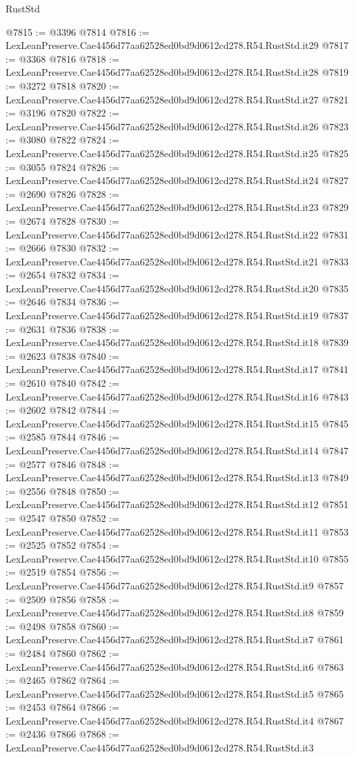 \begin{lexlean}{RustStd}
\begin{coremodule}
@7815 := @3396 @7814
@7816 := LexLeanPreserve.Cae4456d77aa62528ed0bd9d0612cd278.R54.RustStd.it29
@7817 := @3368 @7816
@7818 := LexLeanPreserve.Cae4456d77aa62528ed0bd9d0612cd278.R54.RustStd.it28
@7819 := @3272 @7818
@7820 := LexLeanPreserve.Cae4456d77aa62528ed0bd9d0612cd278.R54.RustStd.it27
@7821 := @3196 @7820
@7822 := LexLeanPreserve.Cae4456d77aa62528ed0bd9d0612cd278.R54.RustStd.it26
@7823 := @3080 @7822
@7824 := LexLeanPreserve.Cae4456d77aa62528ed0bd9d0612cd278.R54.RustStd.it25
@7825 := @3055 @7824
@7826 := LexLeanPreserve.Cae4456d77aa62528ed0bd9d0612cd278.R54.RustStd.it24
@7827 := @2690 @7826
@7828 := LexLeanPreserve.Cae4456d77aa62528ed0bd9d0612cd278.R54.RustStd.it23
@7829 := @2674 @7828
@7830 := LexLeanPreserve.Cae4456d77aa62528ed0bd9d0612cd278.R54.RustStd.it22
@7831 := @2666 @7830
@7832 := LexLeanPreserve.Cae4456d77aa62528ed0bd9d0612cd278.R54.RustStd.it21
@7833 := @2654 @7832
@7834 := LexLeanPreserve.Cae4456d77aa62528ed0bd9d0612cd278.R54.RustStd.it20
@7835 := @2646 @7834
@7836 := LexLeanPreserve.Cae4456d77aa62528ed0bd9d0612cd278.R54.RustStd.it19
@7837 := @2631 @7836
@7838 := LexLeanPreserve.Cae4456d77aa62528ed0bd9d0612cd278.R54.RustStd.it18
@7839 := @2623 @7838
@7840 := LexLeanPreserve.Cae4456d77aa62528ed0bd9d0612cd278.R54.RustStd.it17
@7841 := @2610 @7840
@7842 := LexLeanPreserve.Cae4456d77aa62528ed0bd9d0612cd278.R54.RustStd.it16
@7843 := @2602 @7842
@7844 := LexLeanPreserve.Cae4456d77aa62528ed0bd9d0612cd278.R54.RustStd.it15
@7845 := @2585 @7844
@7846 := LexLeanPreserve.Cae4456d77aa62528ed0bd9d0612cd278.R54.RustStd.it14
@7847 := @2577 @7846
@7848 := LexLeanPreserve.Cae4456d77aa62528ed0bd9d0612cd278.R54.RustStd.it13
@7849 := @2556 @7848
@7850 := LexLeanPreserve.Cae4456d77aa62528ed0bd9d0612cd278.R54.RustStd.it12
@7851 := @2547 @7850
@7852 := LexLeanPreserve.Cae4456d77aa62528ed0bd9d0612cd278.R54.RustStd.it11
@7853 := @2525 @7852
@7854 := LexLeanPreserve.Cae4456d77aa62528ed0bd9d0612cd278.R54.RustStd.it10
@7855 := @2519 @7854
@7856 := LexLeanPreserve.Cae4456d77aa62528ed0bd9d0612cd278.R54.RustStd.it9
@7857 := @2509 @7856
@7858 := LexLeanPreserve.Cae4456d77aa62528ed0bd9d0612cd278.R54.RustStd.it8
@7859 := @2498 @7858
@7860 := LexLeanPreserve.Cae4456d77aa62528ed0bd9d0612cd278.R54.RustStd.it7
@7861 := @2484 @7860
@7862 := LexLeanPreserve.Cae4456d77aa62528ed0bd9d0612cd278.R54.RustStd.it6
@7863 := @2465 @7862
@7864 := LexLeanPreserve.Cae4456d77aa62528ed0bd9d0612cd278.R54.RustStd.it5
@7865 := @2453 @7864
@7866 := LexLeanPreserve.Cae4456d77aa62528ed0bd9d0612cd278.R54.RustStd.it4
@7867 := @2436 @7866
@7868 := LexLeanPreserve.Cae4456d77aa62528ed0bd9d0612cd278.R54.RustStd.it3

\end{coremodule}
\end{lexlean}
